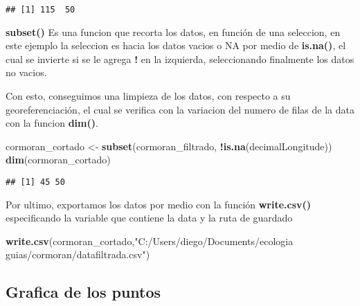 \documentclass[
]{article}
\newenvironment{Shaded}{\begin{snugshade}}{\end{snugshade}}
\newcommand{\FunctionTok}[1]{\textcolor[rgb]{0.13,0.29,0.53}{\textbf{#1}}}
\newcommand{\NormalTok}[1]{#1}
\newcommand{\OtherTok}[1]{\textcolor[rgb]{0.56,0.35,0.01}{#1}}
\newcommand{\SpecialCharTok}[1]{\textcolor[rgb]{0.81,0.36,0.00}{\textbf{#1}}}
\newcommand{\StringTok}[1]{\textcolor[rgb]{0.31,0.60,0.02}{#1}}
\begin{document}
\begin{verbatim}
## [1] 115  50
\end{verbatim}

\textbf{subset()} Es una funcion que recorta los datos, en función de
una seleccion, en este ejemplo la seleccion es hacia los datos vacios o
NA por medio de \textbf{is.na()}, el cual se invierte si se le agrega
\textbf{!} en la izquierda, seleccionando finalmente los datos no
vacios.

Con esto, conseguimos una limpieza de los datos, con respecto a su
georeferenciación, el cual se verifica con la variacion del numero de
filas de la data con la funcion \textbf{dim()}.

\begin{Shaded}
\begin{Highlighting}[]
\NormalTok{cormoran\_cortado }\OtherTok{\textless{}{-}} \FunctionTok{subset}\NormalTok{(cormoran\_filtrado, }\SpecialCharTok{!}\FunctionTok{is.na}\NormalTok{(decimalLongitude))}
\FunctionTok{dim}\NormalTok{(cormoran\_cortado)  }
\end{Highlighting}
\end{Shaded}

\begin{verbatim}
## [1] 45 50
\end{verbatim}

Por ultimo, exportamos los datos por medio con la función
\textbf{write.csv()} especificando la variable que contiene la data y la
ruta de guardado

\begin{Shaded}
\begin{Highlighting}[]
\FunctionTok{write.csv}\NormalTok{(cormoran\_cortado,}\StringTok{"C:/Users/diego/Documents/ecologia guias/cormoran/datafiltrada.csv"}\NormalTok{)}
\end{Highlighting}
\end{Shaded}

\hypertarget{grafica-de-los-puntos}{%
\subsection{Grafica de los puntos}\label{grafica-de-los-puntos}}
\end{document}
